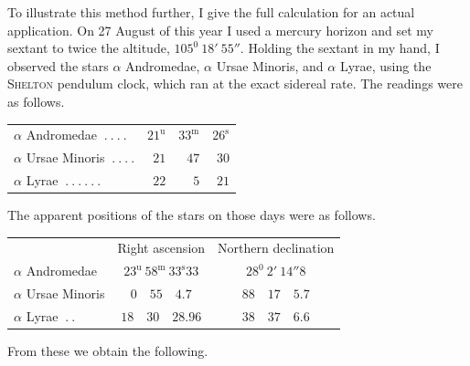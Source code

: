 To illustrate this method further, I give the full calculation for an actual application. On 27 August of this year I used a mercury horizon and set my sextant to twice the altitude, $105^0\ 18'\ 55''$. Holding the sextant in my hand, I observed the stars $\alpha$ Andromedae, $\alpha$ Ursae Minoris, and $\alpha$ Lyrae, using the \textsc{Shelton} pendulum clock, which ran at the exact sidereal rate. The readings were as follows.
\begin{center}
\begin{tabular}{lrrr}
$\alpha$ Andromedae $\ .\ .\ .\ .$&$21^{\mathrm u}$&$33^{\mathrm m}$&$26^{\mathrm s}$\\
$\alpha$ Ursae Minoris $\ .\ .\ .\ .$&$21$&$47$&$30$\\
$\alpha$ Lyrae $\ .\ .\ .\ .\ .\ .$&$22$&$5$&$21$
\end{tabular}
\end{center}
The apparent positions of the stars on those days were as follows.
\begin{center}
\small
\begin{tabular}{lcc}
&Right ascension&Northern declination\\
$\alpha$ Andromedae&$23^{\mathrm u}\ 58^{\mathrm m}\ 33^{\mathrm s}33$&$28^0\ 2'\ 14''8$\\
$\alpha$ Ursae Minoris&$0\quad55\quad4.7$&$88\quad17\quad5.7$\\
$\alpha$ Lyrae $\ .\ .$&$18\quad30\quad28.96$&$38\quad37\quad6.6$
\end{tabular}
\end{center}
From these we obtain the following.
%

